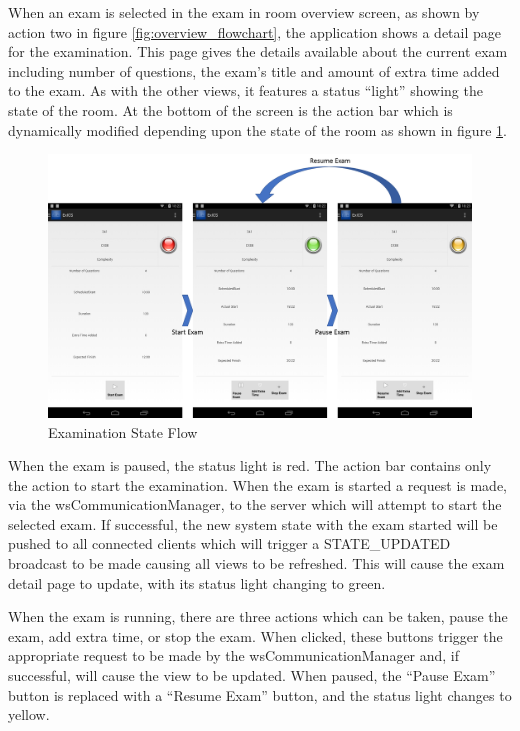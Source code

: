 When an exam is selected in the exam in room overview screen, as shown by action two in figure \ref{fig:overview_flowchart}, the application shows a detail page for the examination.  This page gives the details available about the current exam including number of questions, the exam's title and amount of extra time added to the exam.  As with the other views, it features a status ``light'' showing the state of the room.  At the bottom of the screen is the action bar which is dynamically modified depending upon the state of the room as shown in figure \ref{fig:exam_state_flow}.

\FloatBarrier

\begin{figure}[!htpb]
	\centering
	\includegraphics[width=\textwidth]{"screenshots/exam_state_flowchart"}
	\caption{Examination State Flow}
	\label{fig:exam_state_flow}
\end{figure}

\FloatBarrier

When the exam is paused, the status light is red.  The action bar contains only the action to start the examination.  When the exam is started a request is made, via the wsCommunicationManager, to the server which will attempt to start the selected exam.  If successful, the new system state with the exam started will be pushed to all connected clients which will trigger a STATE\_UPDATED broadcast to be made causing all views to be refreshed.  This will cause the exam detail page to update, with its status light changing to green.

When the exam is running, there are three actions which can be taken, pause the exam, add extra time, or stop the exam.  When clicked, these buttons trigger the appropriate request to be made by the wsCommunicationManager and, if successful, will cause the view to be updated.  When paused, the ``Pause Exam'' button is replaced with a ``Resume Exam'' button, and the status light changes to yellow.

